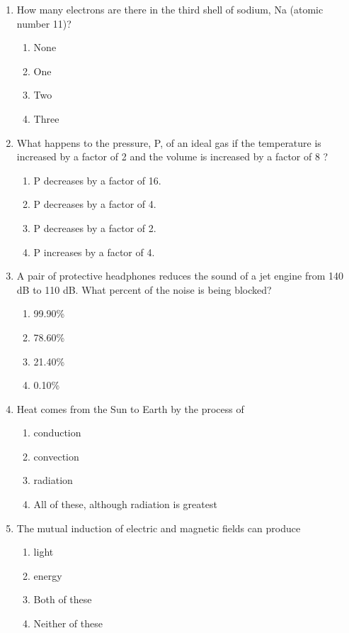 \documentclass[12pt]{article}
\begin{document}
\begin{enumerate}[label=\arabic*.]
\begin{enumerate}[label=(\alph*)]
\end{enumerate}
\item How many electrons are there in the third shell of sodium, Na (atomic number 11)?
\begin{enumerate}[label=(\alph*)]
    \item None
    \item One
    \item Two
    \item Three
\end{enumerate}
\item What happens to the pressure, P, of an ideal gas if the temperature is increased by a factor of 2 and the volume is increased by a factor of 8 ?
\begin{enumerate}[label=(\alph*)]
    \item P decreases by a factor of 16.
    \item P decreases by a factor of 4.
    \item P decreases by a factor of 2.
    \item P increases by a factor of 4.
\end{enumerate}
\item A pair of protective headphones reduces the sound of a jet engine from 140 dB to 110 dB. What percent of the noise is being blocked?
\begin{enumerate}[label=(\alph*)]
    \item 99.90\%
    \item 78.60\%
    \item 21.40\%
    \item 0.10\%
\end{enumerate}
\item Heat comes from the Sun to Earth by the process of
\begin{enumerate}[label=(\alph*)]
    \item conduction
    \item convection
    \item radiation
    \item All of these, although radiation is greatest
\end{enumerate}
\item The mutual induction of electric and magnetic fields can produce
\begin{enumerate}[label=(\alph*)]
    \item light
    \item energy
    \item Both of these
    \item Neither of these

\end{enumerate}
\end{enumerate}
\end{document}
